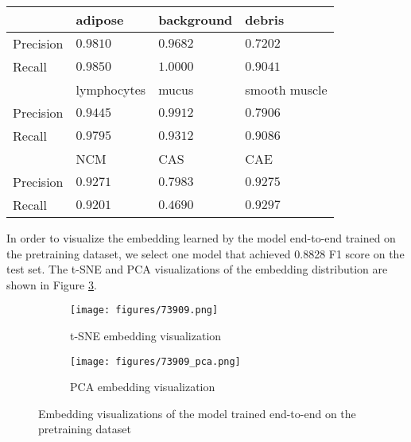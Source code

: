 \documentclass[12pt,twoside]{report}
\begin{document}
\begin{table}[]
    \centering
    \begin{tabular}{llll}
\toprule
 & adipose & background & debris \\
\hline
Precision & $0.9810$ & $0.9682$ & $0.7202$ \\
Recall & $0.9850$ & $1.0000$ & $0.9041$ \\
\toprule
 & lymphocytes & mucus & smooth muscle \\
\hline
Precision & $0.9445$ & $0.9912$ & $0.7906$ \\
Recall & $0.9795$ & $0.9312$ & $0.9086$ \\
\toprule
 & NCM & CAS & CAE \\
\hline
Precision & $0.9271$ & $0.7983$ & $0.9275$ \\
Recall & $0.9201$ & $0.4690$ & $0.9297$ \\
    \bottomrule
    \end{tabular}
    \captionsetup{type=table}
    \label{tab:large_supervised_preci_recall}
\end{table}



In order to visualize the embedding learned by the model end-to-end trained on the pretraining dataset, we select one model that achieved 0.8828 F1 score on the test set. The t-SNE and PCA visualizations of the embedding distribution are shown in Figure \ref{fig:large_supervised_embedding}. \\


\begin{figure}
\centering
    \begin{subfigure}{.45\textwidth}
      \centering
      \texttt{[image: figures/73909.png]}
      \caption{t-SNE embedding visualization}
      \label{fig:large_supervised_tsne}
    \end{subfigure}%
    \begin{subfigure}{.45\textwidth}
      \centering
      \texttt{[image: figures/73909\_pca.png]}
      \caption{PCA embedding visualization}
      \label{fig:large_supervised_pca}
    \end{subfigure}
    \caption{Embedding visualizations of the model trained end-to-end on the pretraining dataset}
    \label{fig:large_supervised_embedding}
\end{figure}
\end{document}
